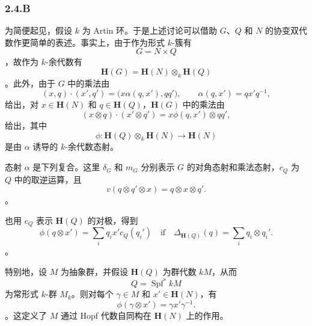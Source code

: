 
\subsubsection*{2.4.B}
\label{sga3:VIIB:2.4.B}

为简便起见，假设 \(k\) 为 Artin 环。于是上述讨论可以借助 \(G\)、\(Q\) 和 \(N\) 的协变双代数作更简单的表述。事实上，由于作为形式 \(k\)-簇有 \[
  G=N\times Q
\]，故作为 \(k\)-余代数有 \[
  \mathbf H(G)
  =
  \mathbf H(N)\otimes_k\mathbf H(Q)
\]。此外，由于 \(G\) 中的乘法由 \[
  (x,q)\cdot(x',q')
  =
  \bigl(x\alpha(q,x'),qq'\bigr),
  \qquad
  \alpha(q,x')=qx'q^{-1},
\] 给出，对 \(x\in\mathbf H(N)\) 和 \(q\in\mathbf H(Q)\)，\(\mathbf H(G)\) 中的乘法由 \[
  (x\otimes q)\cdot(x'\otimes q')
  =
  x\phi(q,x')\otimes qq',
\] 给出，其中 \[
  \phi:
  \mathbf H(Q)\otimes_k\mathbf H(N)
  \longrightarrow
  \mathbf H(N)
\] 是由 \(\alpha\) 诱导的 \(k\)-余代数态射。

态射 \(\alpha\) 是下列复合。这里 \(\delta_G\) 和 \(m_G\) 分别表示 \(G\) 的对角态射和乘法态射，\(c_Q\) 为 \(Q\) 中的取逆运算，且 \[
  v(q\otimes q'\otimes x)=q\otimes x\otimes q'.
\]。\begin{center} \label{sga3:VIIB:2.4.B:conjugation-composite} \end{center}也用 \(c_Q\) 表示 \(\mathbf H(Q)\) 的对极，得到 \[
  \phi(q\otimes x')
  =
  \sum_i q_i x'c_Q(q_i')
  \quad\text{if}\quad
  \Delta_{\mathbf H(Q)}(q)
  =
  \sum_i q_i\otimes q_i'.
  \tag{\(\star\)}\label{sga3:VIIB:2.4.B:equation:covariant-antipode-star}
\]。

特别地，设 \(M\) 为抽象群，并假设 \(\mathbf H(Q)\) 为群代数 \(kM\)，从而 \[
  Q=\operatorname{Spf}^{*}kM
\] 为常形式 \(k\)-群 \(M_k\)。则对每个 \(\gamma\in M\) 和 \(x'\in\mathbf H(N)\)，有 \[
  \phi(\gamma\otimes x')
  =
  \gamma x'\gamma^{-1}.
\]。这定义了 \(M\) 通过 Hopf 代数自同构在 \(\mathbf H(N)\) 上的作用。
